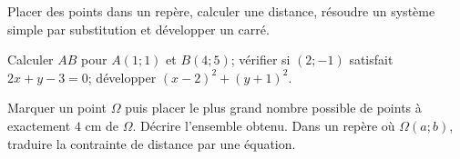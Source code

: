\begin{prerequis}
Placer des points dans un repère, calculer une distance, résoudre un système
simple par substitution et développer un carré.
\end{prerequis}
\begin{automatismes}
Calculer $AB$ pour $A(1;1)$ et $B(4;5)$; vérifier si $(2;-1)$ satisfait
$2x+y-3=0$; développer $(x-2)^2+(y+1)^2$.
\end{automatismes}
\begin{activite}
Marquer un point $\Omega$ puis placer le plus grand nombre possible de points à
exactement $4$ cm de $\Omega$. Décrire l'ensemble obtenu. Dans un repère où
$\Omega(a;b)$, traduire la contrainte de distance par une équation.
\end{activite}

